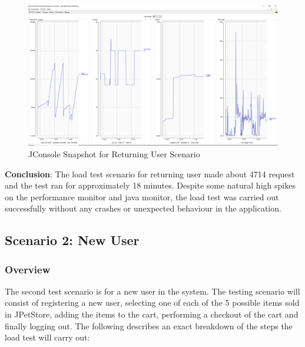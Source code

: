 \documentclass[fontsize=12pt,paper=letter,twoside]{scrartcl}
\begin{document}
\begin{figure}[!htb]
\begin{center}
\includegraphics[width=.7\textwidth]{../../load-test/test-plans/returning-user/jconsole-ru.png}
\end{center}
\caption{JConsole Snapshot for Returning User Scenario}
\label{fig:ruser:jconsole}
\end{figure}

\smallskip
\noindent \textbf{Conclusion}: The load test scenario for returning user made about 4714 request and the test ran for approximately 18 minutes. Despite some natural high spikes on the performance monitor and java monitor, the load test was carried out successfully without any crashes or unexpected behaviour in the application.


\newpage
\subsection{Scenario 2: New User}

\subsubsection{Overview}
The second test scenario is for a new user in the system. The testing scenario will consist of registering a new user, selecting one of each of the 5 possible items sold in JPetStore, adding the items to the cart, performing a checkout of the cart and finally logging out. The following describes an exact breakdown of the steps the load test will carry out:
\end{document}
